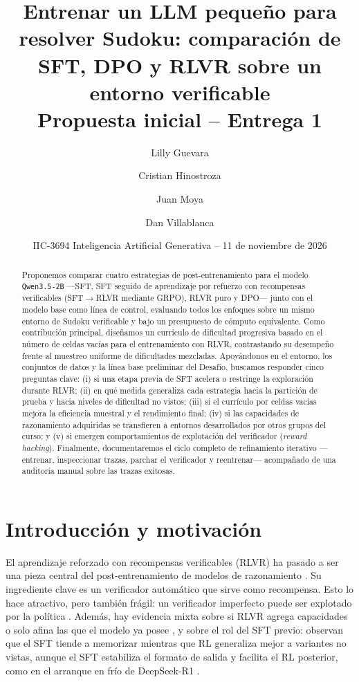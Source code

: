 \documentclass[letterpaper,11pt]{article}
\title{\textbf{Entrenar un LLM pequeño para resolver Sudoku: comparación de SFT, DPO y RLVR sobre un entorno verificable}\\[0.3em]
\large Propuesta inicial -- Entrega 1}
\author{Lilly Guevara \and Cristian Hinostroza \and Juan Moya \and Dan Villablanca}
\date{IIC-3694 Inteligencia Artificial Generativa -- 11 de noviembre de 2026}
\begin{document}
\maketitle

\begin{abstract}
Proponemos comparar cuatro estrategias de post-entrenamiento para el modelo \texttt{Qwen3.5-2B} —SFT, SFT seguido de aprendizaje por refuerzo con recompensas verificables (SFT$\to$RLVR mediante GRPO), RLVR puro y DPO— junto con el modelo base como línea de control, evaluando todos los enfoques sobre un mismo entorno de Sudoku verificable y bajo un presupuesto de cómputo equivalente. Como contribución principal, diseñamos un currículo de dificultad progresiva basado en el número de celdas vacías para el entrenamiento con RLVR, contrastando su desempeño frente al muestreo uniforme de dificultades mezcladas. Apoyándonos en el entorno, los conjuntos de datos y la línea base preliminar del Desafío, buscamos responder cinco preguntas clave: (i) si una etapa previa de SFT acelera o restringe la exploración durante RLVR; (ii) en qué medida generaliza cada estrategia hacia la partición de prueba y hacia niveles de dificultad no vistos; (iii) si el currículo por celdas vacías mejora la eficiencia muestral y el rendimiento final; (iv) si las capacidades de razonamiento adquiridas se transfieren a entornos desarrollados por otros grupos del curso; y (v) si emergen comportamientos de explotación del verificador (\emph{reward hacking}). Finalmente, documentaremos el ciclo completo de refinamiento iterativo —entrenar, inspeccionar trazas, parchar el verificador y reentrenar— acompañado de una auditoría manual sobre las trazas exitosas.
\end{abstract}

\section{Introducción y motivación}
El aprendizaje reforzado con recompensas verificables (RLVR) ha pasado a ser una pieza central del post-entrenamiento de modelos de razonamiento \citep{lambert2024tulu3,deepseekr1}. Su ingrediente clave es un verificador automático que sirve como recompensa. Esto lo hace atractivo, pero también frágil: un verificador imperfecto puede ser explotado por la política \citep{skalse2022reward}. Además, hay evidencia mixta sobre si RLVR agrega capacidades o solo afina las que el modelo ya posee \citep{yue2025limit}, y sobre el rol del SFT previo: \citet{chu2025sft} observan que el SFT tiende a memorizar mientras que RL generaliza mejor a variantes no vistas, aunque el SFT estabiliza el formato de salida y facilita el RL posterior, como en el arranque en frío de DeepSeek-R1 \citep{deepseekr1}.
\end{document}
